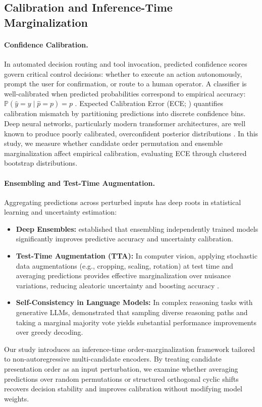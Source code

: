 \documentclass[10pt]{article}
\begin{document}
\subsection{Calibration and Inference-Time Marginalization}
\paragraph{Confidence Calibration.} In automated decision routing and tool invocation, predicted confidence scores govern critical control decisions: whether to execute an action autonomously, prompt the user for confirmation, or route to a human operator. A classifier is well-calibrated when predicted probabilities correspond to empirical accuracy: $\mathbb{P}(\hat{y} = y \mid \hat{p} = p) = p$ \citep{guo2017calibration}. Expected Calibration Error (ECE; \citealp{naeini2015obtaining, nixon2019measuring}) quantifies calibration mismatch by partitioning predictions into discrete confidence bins. Deep neural networks, particularly modern transformer architectures, are well known to produce poorly calibrated, overconfident posterior distributions \citep{guo2017calibration}. In this study, we measure whether candidate order permutation and ensemble marginalization affect empirical calibration, evaluating ECE through clustered bootstrap distributions.

\paragraph{Ensembling and Test-Time Augmentation.} Aggregating predictions across perturbed inputs has deep roots in statistical learning and uncertainty estimation:
\begin{itemize}
    \item \textbf{Deep Ensembles:} \citet{lakshminarayanan2017simple} established that ensembling independently trained models significantly improves predictive accuracy and uncertainty calibration.
    \item \textbf{Test-Time Augmentation (TTA):} In computer vision, applying stochastic data augmentations (e.g., cropping, scaling, rotation) at test time and averaging predictions provides effective marginalization over nuisance variations, reducing aleatoric uncertainty and boosting accuracy \citep{ayhan2018test, shanmugam2020when}.
    \item \textbf{Self-Consistency in Language Models:} In complex reasoning tasks with generative LLMs, \citet{wang2023selfconsistency} demonstrated that sampling diverse reasoning paths and taking a marginal majority vote yields substantial performance improvements over greedy decoding.
\end{itemize}
Our study introduces an inference-time order-marginalization framework tailored to non-autoregressive multi-candidate encoders. By treating candidate presentation order as an input perturbation, we examine whether averaging predictions over random permutations or structured orthogonal cyclic shifts recovers decision stability and improves calibration without modifying model weights.
\end{document}

